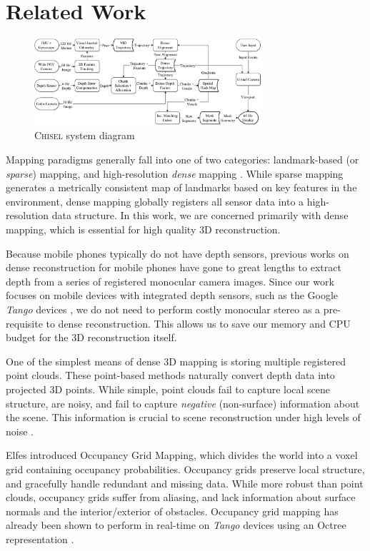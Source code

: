 \documentclass[conference]{IEEEtran}
\newcommand{\Tango}{\textit{Tango}\xspace}
\newcommand{\chisel}{\textsc{Chisel}\xspace}
\begin{document}
\section{Related Work}
\label{sec:related_work}
\begin{figure}\centering
	      \includegraphics[width=0.75\textwidth]{img/system_diagram}
	      \caption{\chisel system diagram}
	 	 \label{fig:system_diagram}
\end{figure}
Mapping paradigms generally fall into one of two categories: landmark-based (or
\emph{sparse}) mapping, and high-resolution \emph{dense} mapping
\cite{FastSlam}.  While sparse mapping generates a metrically consistent map of
landmarks based on key features in the environment, dense mapping globally
registers all sensor data into a high-resolution data structure. In this work,
we are concerned primarily with dense mapping, which is essential for high
quality 3D reconstruction.

Because mobile phones typically do not have depth sensors, previous works
\cite{TanskanenMetric, DTAM, LSDSlam} on dense reconstruction for mobile phones
have gone to great lengths to extract depth from a series of registered monocular camera
images. Since our work focuses on mobile devices with integrated depth sensors,
such as the Google \Tango devices \cite{Tango}, we do not need to perform
costly monocular stereo as a pre-requisite to dense reconstruction. This allows
us to save our memory and CPU budget for the 3D reconstruction itself.

One of the simplest means of dense 3D mapping is storing multiple registered
point clouds. These point-based methods \cite{RusinkiewiczPoints,
TanskanenMetric, WeiseScanning, LSDSlam} naturally convert depth data into
projected 3D points. While simple, point clouds fail to capture local scene
structure, are noisy, and fail to capture \emph{negative} (non-surface)
information about the scene. This information is crucial to scene reconstruction
under high levels of noise \cite{Klingensmith2014}.

Elfes \cite{Elfes1989} introduced Occupancy Grid Mapping, which divides the
world into a voxel grid containing occupancy probabilities. Occupancy grids
preserve local structure, and gracefully handle redundant and missing data.  
While more robust than point clouds, occupancy grids suffer from aliasing, and
lack information about surface normals and the interior/exterior of obstacles. 
Occupancy grid mapping has already been shown to perform in real-time on \Tango
\cite{Tango} devices using an Octree representation \cite{Wurm2010}.
\end{document}
